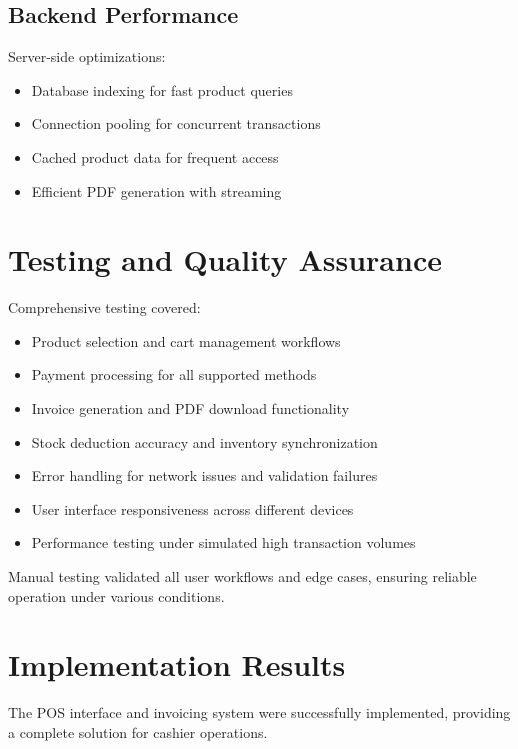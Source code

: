 \subsection*{Backend Performance}

Server-side optimizations:
\begin{itemize}
  \item Database indexing for fast product queries
  \item Connection pooling for concurrent transactions
  \item Cached product data for frequent access
  \item Efficient PDF generation with streaming
\end{itemize}

\section{Testing and Quality Assurance}

Comprehensive testing covered:

\begin{itemize}
  \item Product selection and cart management workflows
  \item Payment processing for all supported methods
  \item Invoice generation and PDF download functionality
  \item Stock deduction accuracy and inventory synchronization
  \item Error handling for network issues and validation failures
  \item User interface responsiveness across different devices
  \item Performance testing under simulated high transaction volumes
\end{itemize}

Manual testing validated all user workflows and edge cases, ensuring reliable operation under various conditions.

\section{Implementation Results}

The POS interface and invoicing system were successfully implemented, providing a complete solution for cashier operations.

